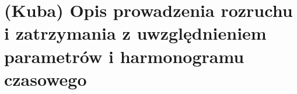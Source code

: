 \section{(Kuba) Opis prowadzenia rozruchu i zatrzymania z uwzględnieniem parametrów
i harmonogramu czasowego}